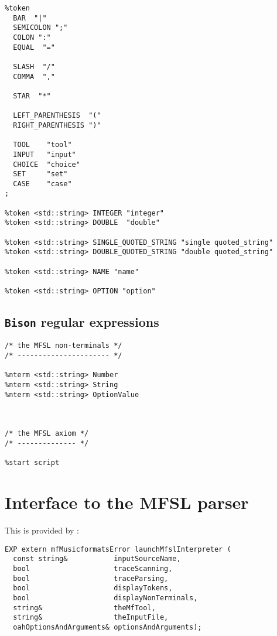 \begin{lstlisting}[language=Terminal]
%define api.token.prefix {TOK_}
%token
  BAR  "|"
  SEMICOLON ";"
  COLON ":"
  EQUAL  "="

  SLASH  "/"
  COMMA  ","

  STAR  "*"

  LEFT_PARENTHESIS  "("
  RIGHT_PARENTHESIS ")"

  TOOL    "tool"
  INPUT   "input"
  CHOICE  "choice"
  SET     "set"
  CASE    "case"
;

%token <std::string> INTEGER "integer"
%token <std::string> DOUBLE  "double"

%token <std::string> SINGLE_QUOTED_STRING "single quoted_string"
%token <std::string> DOUBLE_QUOTED_STRING "double quoted_string"

%token <std::string> NAME "name"

%token <std::string> OPTION "option"
\end{lstlisting}


\subsection{{\tt Bison} regular expressions}

\begin{lstlisting}[language=Terminal]
/* the MFSL non-terminals */
/* ---------------------- */

%nterm <std::string> Number
%nterm <std::string> String
%nterm <std::string> OptionValue



/* the MFSL axiom */
/* -------------- */

%start script
\end{lstlisting}


\section{Interface to the MFSL parser}

This is provided by :
\begin{lstlisting}[language=Terminal]
EXP extern mfMusicformatsError launchMfslInterpreter (
  const string&           inputSourceName,
  bool                    traceScanning,
  bool                    traceParsing,
  bool                    displayTokens,
  bool                    displayNonTerminals,
  string&                 theMfTool,
  string&                 theInputFile,
  oahOptionsAndArguments& optionsAndArguments);
\end{lstlisting}

